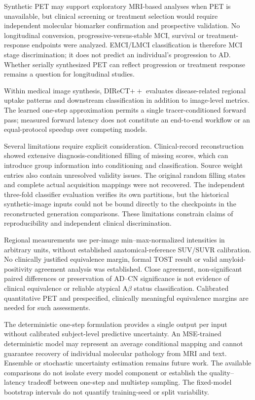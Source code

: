 \documentclass{article}
\begin{document}
Synthetic PET may support exploratory MRI-based analyses when PET is unavailable, but clinical screening or treatment selection would require independent molecular biomarker confirmation and prospective validation. No longitudinal conversion, progressive-versus-stable MCI, survival or treatment-response endpoints were analyzed. EMCI/LMCI classification is therefore MCI stage discrimination; it does not predict an individual's progression to AD. Whether serially synthesized PET can reflect progression or treatment response remains a question for longitudinal studies.

Within medical image synthesis, DIReCT$++$ evaluates disease-related regional uptake patterns and downstream classification in addition to image-level metrics. The learned one-step approximation permits a single tracer-conditioned forward pass; measured forward latency does not constitute an end-to-end workflow or an equal-protocol speedup over competing models.

Several limitations require explicit consideration. Clinical-record reconstruction showed extensive diagnosis-conditioned filling of missing scores, which can introduce group information into conditioning and classification. Source weight entries also contain unresolved validity issues. The original random filling states and complete actual acquisition mappings were not recovered. The independent three-fold classifier evaluation verifies its own partitions, but the historical synthetic-image inputs could not be bound directly to the checkpoints in the reconstructed generation comparisons. These limitations constrain claims of reproducibility and independent clinical discrimination.

Regional measurements use per-image min--max-normalized intensities in arbitrary units, without established anatomical-reference SUV/SUVR calibration. No clinically justified equivalence margin, formal TOST result or valid amyloid-positivity agreement analysis was established. Close agreement, non-significant paired differences or preservation of AD--CN significance is not evidence of clinical equivalence or reliable atypical A$\beta$ status classification. Calibrated quantitative PET and prespecified, clinically meaningful equivalence margins are needed for such assessments.

The deterministic one-step formulation provides a single output per input without calibrated subject-level predictive uncertainty. An MSE-trained deterministic model may represent an average conditional mapping and cannot guarantee recovery of individual molecular pathology from MRI and text. Ensemble or stochastic uncertainty estimation remains future work. The available comparisons do not isolate every model component or establish the quality--latency tradeoff between one-step and multistep sampling. The fixed-model bootstrap intervals do not quantify training-seed or split variability.
\end{document}

